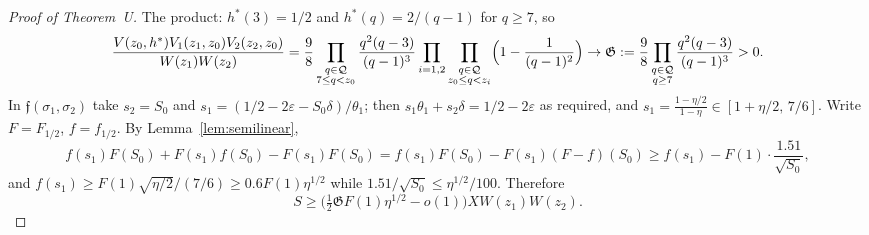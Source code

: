 \documentclass[11pt,reqno]{amsart}
\theoremstyle{definition}
\newcommand{\cQ}{\mathcal Q}
\begin{document}
\begin{proof}[Proof of Theorem~U]
The product: $h^*(3)=1/2$ and $h^*(q)=2/(q-1)$ for $q\ge7$, so
\[
\frac{V(z_0,h^*)V_1(z_1,z_0)V_2(z_2,z_0)}{W(z_1)W(z_2)}
=\frac98\prod_{\substack{q\in\cQ\\ 7\le q<z_0}}\frac{q^2(q-3)}{(q-1)^3}\prod_{i=1,2}\prod_{\substack{q\in\cQ\\ z_0\le q<z_i}}\Bigl(1-\frac1{(q-1)^2}\Bigr)
\to\mathfrak G:=\frac98\prod_{\substack{q\in\cQ\\ q\ge7}}\frac{q^2(q-3)}{(q-1)^3}>0.
\]
In $\mathfrak f(\sigma_1,\sigma_2)$ take $s_2=S_0$ and
$s_1=(1/2-2\varepsilon-S_0\delta)/\theta_1$; then
$s_1\theta_1+s_2\delta=1/2-2\varepsilon$ as required, and
$s_1=\frac{1-\eta/2}{1-\eta}\in[1+\eta/2,\,7/6]$.  Write $F=F_{1/2}$,
$f=f_{1/2}$.  By Lemma~\ref{lem:semilinear},
\[
f(s_1)F(S_0)+F(s_1)f(S_0)-F(s_1)F(S_0)=f(s_1)F(S_0)-F(s_1)(F-f)(S_0)\ge f(s_1)-F(1)\cdot\frac{1.51}{\sqrt{S_0}},
\]
and $f(s_1)\ge F(1)\sqrt{\eta/2}/(7/6)\ge0.6F(1)\eta^{1/2}$ while
$1.51/\sqrt{S_0}\le\eta^{1/2}/100$.  Therefore
\begin{equation}\label{eq:Umain}
S\ge\bigl(\tfrac12\mathfrak GF(1)\eta^{1/2}-o(1)\bigr)XW(z_1)W(z_2).
\end{equation}


\end{proof}
\end{document}
